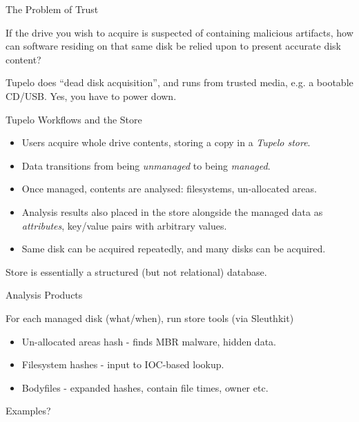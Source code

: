 \documentclass{beamer}
\begin{document}

\begin{frame}{The Problem of Trust}

If the drive you wish to acquire is suspected of containing
malicious artifacts, how can software residing on that same disk
be relied upon to present accurate disk content? 

\vskip 20pt

Tupelo does ``dead disk acquisition'', and runs from trusted media,
e.g. a bootable CD/USB.  Yes, you have to power down.

\end{frame}


\begin{frame}{Tupelo Workflows and the Store}

\begin{itemize}
\item
Users acquire whole drive contents, storing a copy in a {\em Tupelo
  store}.

\item
Data transitions from being {\em unmanaged} to being {\em managed}.

\item
Once managed, contents are analysed: filesystems, un-allocated
areas.

\item
Analysis results also placed in the store alongside the managed data
as {\em attributes}, key/value pairs with arbitrary values.

\item
Same disk can be acquired repeatedly, and many disks can be acquired.

\end{itemize}

Store is essentially a structured (but not relational) database.

\end{frame}


\begin{frame}{Analysis Products}

For each managed disk (what/when), run store tools (via Sleuthkit)

\begin{itemize}
\item Un-allocated areas hash - finds MBR malware, hidden data.

\item
Filesystem hashes - input to IOC-based lookup.

\item
Bodyfiles - expanded hashes, contain file times, owner etc.

\end{itemize}

Examples?

\end{frame}
\end{document}
